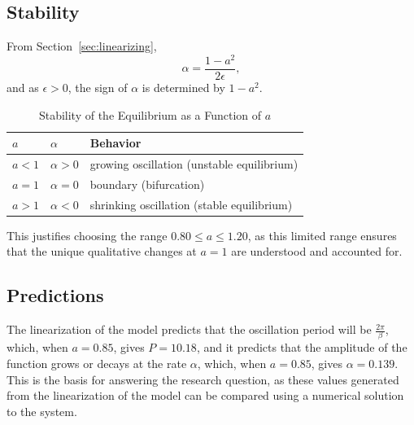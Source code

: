     \subsection{Stability}\label{subsec:stability}

    From Section~\ref{sec:linearizing},
    \[
        \alpha=\frac{1-a^2}{2\epsilon},
    \]
    and as $\epsilon>0$, the sign of $\alpha$ is determined by $1-a^2$.

    \begin{table}[H]
        \centering
        \begin{tabular}{lll}
            \toprule
            \textbf{$a$} & \textbf{$\alpha$} & \textbf{Behavior} \\
            \midrule
            $a<1$ & $\alpha>0$ & growing oscillation (unstable equilibrium) \\
            $a=1$ & $\alpha=0$ & boundary (bifurcation) \\
            $a>1$ & $\alpha<0$ & shrinking oscillation (stable equilibrium) \\
            \bottomrule
        \end{tabular}
        \caption{Stability of the Equilibrium as a Function of $a$}
        \label{tab:stability}
    \end{table}

    This justifies choosing the range $0.80\leq a\leq 1.20$, as this limited range ensures that the unique qualitative changes at $a=1$ are understood and accounted for.

    \subsection{Predictions}\label{subsec:predictions}

    The linearization of the model predicts that the oscillation period will be $\frac{2\pi}{\beta}$, which, when $a=0.85$, gives $P=10.18$, and it predicts that the amplitude of the function grows or decays at the rate $\alpha$, which, when $a=0.85$, gives $\alpha=0.139$. This is the basis for answering the research question, as these values generated from the linearization of the model can be compared using a numerical solution to the system.